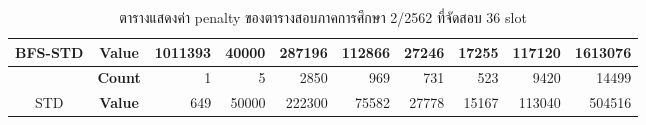 \begin{table}[]
{\begin{tabular}{@{}ccrrrrrrrr@{}}
    \multirow{-2}{*}{BFS-STD}                    & \textbf{Value}                        & 1011393                        & 40000                          & 287196                         & 112866                         & 27246                          & 17255                          & 117120                         & 1613076                          \\ \midrule
                                                  & {\textbf{Count}} & {1}       & {5}       & {2850}    & {969}     & {731}     & {523}     & {9420}    & {14499}     \\ \cmidrule(l){2-10} 
    \multirow{-2}{*}{STD} & {\textbf{Value}} & {649}     & {50000}   & {222300}  & {75582}   & {27778}   & {15167}   & {113040}  & {504516}    \\ \bottomrule
    \end{tabular}%
    }
    \caption{ตารางแสดงค่า penalty ของตารางสอบภาคการศึกษา 2/2562 ที่จัดสอบ 36 slot}
    \label{tab:result_table_262_36}
\end{table}
